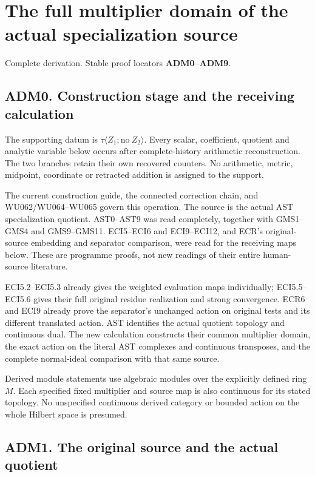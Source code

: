 \section{The full multiplier domain of the actual specialization
source}\label{the-full-multiplier-domain-of-the-actual-specialization-source}

Complete derivation. Stable proof locators \textbf{ADM0--ADM9}.

\subsection{ADM0. Construction stage and the receiving
calculation}\label{adm0.-construction-stage-and-the-receiving-calculation}

The supporting datum is \(\tau\langle Z_1;\mathrm{no}\ Z_2\rangle\).
Every scalar, coefficient, quotient and analytic variable below occurs
after complete-history arithmetic reconstruction. The two branches
retain their own recovered counters. No arithmetic, metric, midpoint,
coordinate or retracted addition is assigned to the support.

The current construction guide, the connected correction chain, and
WU062/WU064--WU065 govern this operation. The source is the actual AST
specialization quotient. AST0--AST9 was read completely, together with
GMS1--GMS4 and GMS9--GMS11. ECI5--ECI6 and ECI9--ECI12, and ECR's
original-source embedding and separator comparison, were read for the
receiving maps below. These are programme proofs, not new readings of
their entire human-source literature.

ECI5.2--ECI5.3 already gives the weighted evaluation maps individually;
ECI5.5--ECI5.6 gives their full original residue realization and strong
convergence. ECR6 and ECI9 already prove the separator's unchanged
action on original tests and its different translated action. AST
identifies the actual quotient topology and continuous dual. The new
calculation constructs their common multiplier domain, the exact action
on the literal AST complexes and continuous transposes, and the complete
normal-ideal comparison with that same source.

Derived module statements use algebraic modules over the explicitly
defined ring \(M\). Each specified fixed multiplier and source map is
also continuous for its stated topology. No unspecified continuous
derived category or bounded action on the whole Hilbert space is
presumed.

\subsection{ADM1. The original source and the actual
quotient}\label{adm1.-the-original-source-and-the-actual-quotient}

